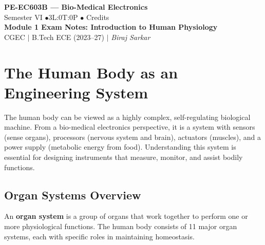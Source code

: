 \documentclass[12pt,a4paper]{article}
\begin{document}

\begin{center}
  {\LARGE\bfseries\color{myred} PE-EC603B --- Bio-Medical Electronics}\\[5pt]
  {\normalsize\color{mydark} Semester VI \quad$\bullet$\quad 3L:0T:0P \quad$\bullet$ Credits}\\[3pt]
  {\normalsize\color{myteal}\textbf{Module 1 Exam Notes: Introduction to Human Physiology}}\\[3pt]
  {\small\color{mydark} CGEC \;$|$\; B.Tech ECE (2023--27) \;$|$\; \textit{Biraj Sarkar}}
\end{center}
\vspace{2pt}
\noindent{\color{myred}\rule{\linewidth}{1.5pt}}
\vspace{2pt}

\hypersetup{linkcolor=mydark}
\tableofcontents
\hypersetup{linkcolor=myteal}
\newpage

\section{The Human Body as an Engineering System}

The human body can be viewed as a highly complex, self-regulating biological machine. From a bio-medical electronics perspective, it is a system with sensors (sense organs), processors (nervous system and brain), actuators (muscles), and a power supply (metabolic energy from food). Understanding this system is essential for designing instruments that measure, monitor, and assist bodily functions.

\subsection{Organ Systems Overview}

\begin{tcolorbox}[defbox, title={\textbf{Definition: Organ System}}]
An \textbf{organ system} is a group of organs that work together to perform one or more physiological functions. The human body consists of 11 major organ systems, each with specific roles in maintaining homeostasis.
\end{tcolorbox}
\end{document}
